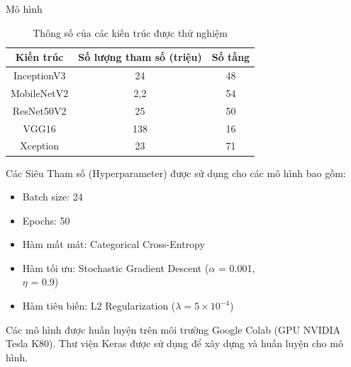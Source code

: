 \documentclass{beamer}
\begin{document}
\begin{frame}[allowframebreaks]{Mô hình}
	\framebreak

	\begin{table}[H]
		\centering
		\begin{tabular}{|c|c|c|}
		\hline
		Kiến trúc   & Số lượng tham số (triệu) & Số tầng \\ \hline
		InceptionV3 & 24                       & 48      \\
		MobileNetV2 & 2,2                      & 54      \\
		ResNet50V2  & 25                       & 50      \\
		VGG16       & 138                      & 16      \\
		Xception    & 23                       & 71      \\ \hline
		\end{tabular}

		\caption{Thông số của các kiến trúc được thử nghiệm}
	\end{table}

	\framebreak
	Các Siêu Tham số (Hyperparameter) được sử dụng cho các mô hình bao gồm:

	\begin{itemize}
		\item Batch size: 24
		\item Epochs: 50
		\item Hàm mất mát: Categorical Cross-Entropy
		\item Hàm tối ưu: Stochastic Gradient Descent
			($\alpha$ = 0.001,\\$\eta$ = 0.9)
		\item Hàm tiêu biến: L2 Regularization ($\lambda = 5 \times 10^{-4}$)
	\end{itemize}

	\framebreak

	Các mô hình được huấn luyện trên môi trường Google Colab (GPU NVIDIA Tesla K80). Thư viện Keras được sử dụng để xây dựng và huấn luyện cho mô hình.

	\framebreak


\end{frame}
\end{document}
